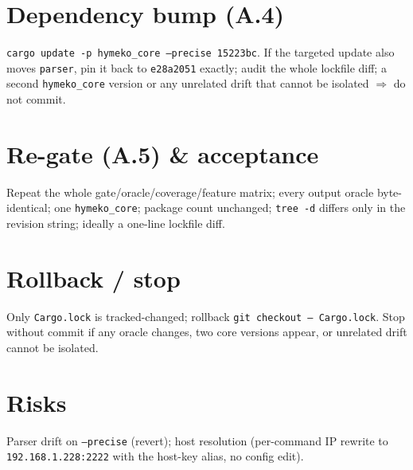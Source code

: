 \documentclass[11pt]{article}
\begin{document}
\section{Dependency bump (A.4)}
\texttt{cargo update -p hymeko\_core --precise 15223bc}. If the targeted update
also moves \texttt{parser}, pin it back to \texttt{e28a2051} exactly; audit the
whole lockfile diff; a second \texttt{hymeko\_core} version or any unrelated drift
that cannot be isolated $\Rightarrow$ do not commit.

\section{Re-gate (A.5) \& acceptance}
Repeat the whole gate/oracle/coverage/feature matrix; every output oracle
byte-identical; one \texttt{hymeko\_core}; package count unchanged;
\texttt{tree -d} differs only in the revision string; ideally a one-line lockfile
diff.

\section{Rollback / stop}
Only \texttt{Cargo.lock} is tracked-changed; rollback \texttt{git checkout --
Cargo.lock}. Stop without commit if any oracle changes, two core versions appear,
or unrelated drift cannot be isolated.

\section{Risks}
Parser drift on \texttt{--precise} (revert); host resolution (per-command IP
rewrite to \texttt{192.168.1.228:2222} with the host-key alias, no config edit).
\end{document}
